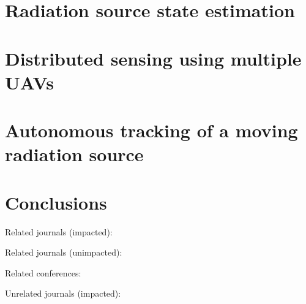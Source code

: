 \documentclass[a4paper,11pt,titlepage,twoside]{article}
\begin{document}



\clearpage


\section{Radiation source state estimation}

\clearpage


\section{Distributed sensing using multiple UAVs}

\section{Autonomous tracking of a moving radiation source}



\section{Conclusions}

Related journals (impacted):
\cite{baca2019jfr}
\cite{baca2018rospix}
\cite{spurny2018jfr}
\cite{saska2016auro}
\cite{giernacky2019realtime}
\cite{chudoba2016exploration}

Related journals (unimpacted):
\cite{loianno2018localization}

Related conferences:
\cite{baca2019timepix}
\cite{baca2018mpc}
\cite{baca2016embedded}
\cite{baca2017autonomous}
\cite{saska2017documentation}
\cite{spurny2016mmar}
\cite{faigl2017onsolution}
\cite{saska2016migrating}

Unrelated journals (impacted):
\cite{baca2016vzlusat}
\cite{baca2018vzlusat}
\cite{daniel2019inorbit}
\cite{urban2017vzlusat}
\end{document}
